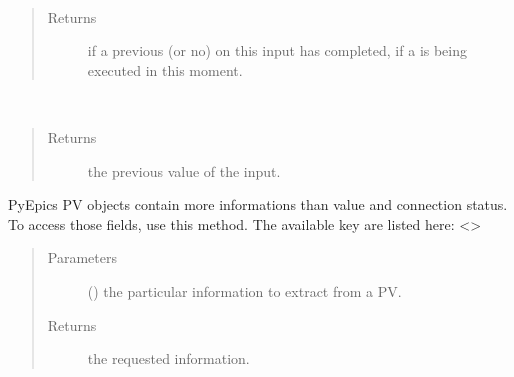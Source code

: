 \documentclass[letterpaper,10pt,english]{sphinxmanual}
\begin{document}

\begin{fulllineitems}
\label{\detokenize{io:putComplete}}~\begin{quote}\begin{description}
\item[{Returns}] \leavevmode
{} if a previous (or no) {\hyperref[\detokenize{io:put}]{}} on this input has completed,  if a {\hyperref[\detokenize{io:put}]{}} is being executed in this moment.

\end{description}\end{quote}

\end{fulllineitems}


\begin{fulllineitems}
\label{\detokenize{io:pval}}~\begin{quote}\begin{description}
\item[{Returns}] \leavevmode
the previous value of the input.

\end{description}\end{quote}

\end{fulllineitems}


\begin{fulllineitems}
\label{\detokenize{io:data}}
PyEpics PV objects contain more informations than value and connection
status. To access those fields, use this method. The available key are listed
here: \textless{}\textgreater{}
\begin{quote}\begin{description}
\item[{Parameters}] \leavevmode
{} () \textendash{} the particular information to extract from a PV.

\item[{Returns}] \leavevmode
the requested information.

\end{description}\end{quote}

\end{fulllineitems}
\end{document}
